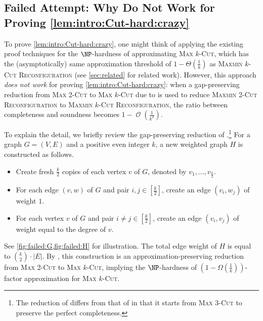 \documentclass[11pt,fleqn]{article}
\newcommand{\prb}[1]{\textsc{#1}\xspace}
\DeclareMathOperator{\bigO}{\mathcal{O}}
\newcommand{\MMkCutReconf}{\prb{Maxmin $k$-Cut Reconfiguration}}
\newcommand{\MMtwoCutReconf}{\prb{Maxmin 2-Cut Reconfiguration}}
\theoremstyle{definition}
\numberwithin{equation}{section}
\begin{document}
\subsection{Failed Attempt: Why \texorpdfstring{\cite{kann1997hardness,guruswami2013improved}}{[GS13, KKLP97]} Do Not Work for Proving \texorpdfstring{\cref{lem:intro:Cut-hard:crazy}}{Lemma~\protect\ref{lem:intro:Cut-hard:crazy}}}
\label{sec:overview-Cut-hard:failed}


To prove \cref{lem:intro:Cut-hard:crazy},
one might think of applying the existing proof techniques for
the $\NP$-hardness of approximating \prb{Max $k$-Cut},
which has the (asymptotically) same approximation threshold of $1-\Theta\left(\frac{1}{k}\right)$ as \MMkCutReconf
\cite{kann1997hardness,guruswami2013improved,austrin2014new,frieze1997improved}
(see \cref{sec:related} for related work).
However, this approach \emph{does not work} for proving \cref{lem:intro:Cut-hard:crazy}:
when a gap-preserving reduction from \prb{Max 2-Cut} to \prb{Max $k$-Cut}
due to \cite{kann1997hardness,guruswami2013improved}
is used to reduce \MMtwoCutReconf to \MMkCutReconf,
the ratio between completeness and soundness becomes $1 - \bigO\left(\frac{1}{k^2}\right)$.


To explain the detail,
we briefly review the gap-preserving reduction of \citet{kann1997hardness}.\footnote{
    The reduction of \citet{guruswami2013improved} differs from that of \cite{kann1997hardness} in that
    it starts from \prb{Max $3$-Cut} to preserve the perfect completeness.
}
For a graph $G=(V,E)$ and a positive even integer $k$,
a new weighted graph $H$ is constructed as follows.
\begin{itemize}
\item 
    Create fresh $\frac{k}{2}$ copies of each vertex $v$ of $G$,
    denoted by $v_{1}, \ldots, v_{\frac{k}{2}}$.
\item
    For each edge $(v,w)$ of $G$ and pair $i,j \in \left[\frac{k}{2}\right]$,
    create an edge $(v_i, w_j)$ of weight $1$.
\item
    For each vertex $v$ of $G$ and pair $i \neq j \in \left[\frac{k}{2}\right]$,
    create an edge $(v_i, v_j)$ of weight equal to the degree of $v$.
\end{itemize}
See \cref{fig:failed:G,fig:failed:H} for illustration.
The total edge weight of $H$ is equal to ${k \choose 2} \cdot |E|$.
By \cite{kann1997hardness}, this construction is
an approximation-preserving reduction from \prb{Max 2-Cut} to \prb{Max $k$-Cut},
implying the $\NP$-hardness of
$\left(1-\Omega\left(\frac{1}{k}\right)\right)$-factor approximation for \prb{Max $k$-Cut}.
\end{document}
